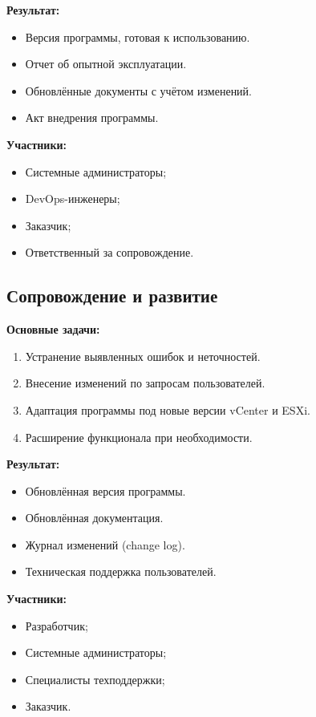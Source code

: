 \textbf{Результат:}
\begin{itemize}
    \item Версия программы, готовая к использованию.
    \item Отчет об опытной эксплуатации.
    \item Обновлённые документы с учётом изменений.
    \item Акт внедрения программы.
\end{itemize}

\textbf{Участники:}
\begin{itemize}
    \item Системные администраторы;
    \item DevOps-инженеры;
    \item Заказчик;
    \item Ответственный за сопровождение.
\end{itemize}

\subsection{Сопровождение и развитие}

\textbf{Основные задачи:}
\begin{enumerate}
    \item Устранение выявленных ошибок и неточностей.
    \item Внесение изменений по запросам пользователей.
    \item Адаптация программы под новые версии vCenter и ESXi.
    \item Расширение функционала при необходимости.
\end{enumerate}

\textbf{Результат:}
\begin{itemize}
    \item Обновлённая версия программы.
    \item Обновлённая документация.
    \item Журнал изменений (change log).
    \item Техническая поддержка пользователей.
\end{itemize}

\textbf{Участники:}
\begin{itemize}
    \item Разработчик;
    \item Системные администраторы;
    \item Специалисты техподдержки;
    \item Заказчик.
\end{itemize}

